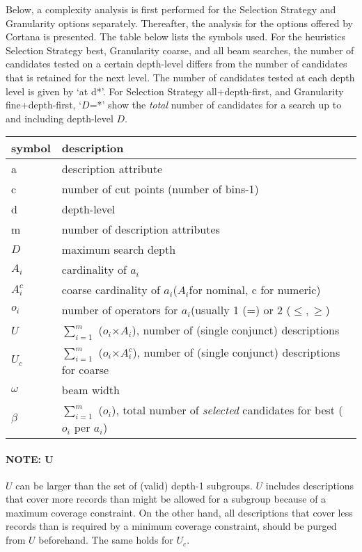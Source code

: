 \documentclass[a4paper]{article}
\newcommand{\ai}{$a_i$}
\newcommand{\Ai}{$A_i$}
\newcommand{\Ci}{$A_i^c$}
\newcommand{\oi}{$o_i$}
\newcommand{\D}{D}
\newcommand{\uu}{$U$}
\newcommand{\uc}{$U_c$}
\newcommand{\bw}{$\omega$}
\newcommand{\bb}[1]{$\beta^{\text{#1}}$}
\newcommand{\X}{$\times$} %
\begin{document}
Below, a complexity analysis is first performed for the Selection Strategy and Granularity options separately.
Thereafter, the analysis for the options offered by Cortana is presented.
The table below lists the symbols used.
For the heuristics Selection Strategy best, Granularity coarse, and all beam searches, the number of candidates tested on a certain depth-level differs from the number of candidates that is retained for the next level.
The number of candidates tested at each depth level is given by `at d*'.
For Selection Strategy all+depth-first, and Granularity fine+depth-first, `$\D$=*' show the \emph{total} number of candidates for a search up to and including depth-level $\D$.

\begin{table}[!h]
\centering
\begin{tabular}{ll}
symbol & description\\
\hline
a      & description attribute\\
c      & number of cut points (number of bins{-}1)\\
d      & depth-level\\
m      & number of description attributes\\
$\D$   & maximum search depth\\
\Ai    & cardinality of \ai\\
\Ci    & coarse cardinality of \ai (\Ai for nominal, c for numeric)\\
\oi    & number of operators for \ai (usually 1 (=) or 2 ($\leq, \geq$)\\
\hline
\uu    & $\sum_{i=1}^m$ (\oi{}\X{}\Ai), number of (single conjunct) descriptions\\
\uc    & $\sum_{i=1}^m$ (\oi{}\X{}\Ci), number of (single conjunct) descriptions for coarse\\
\bw    & beam width\\
\bb{}  & $\sum_{i=1}^m$ (\oi), total number of \emph{selected} candidates for best (\oi{} per \ai)\\
\end{tabular}
\end{table}

\paragraph{NOTE: U}
\uu{} can be larger than the set of (valid) depth-1 subgroups.
\uu{} includes descriptions that cover more records than might be allowed for a subgroup because of a maximum coverage constraint.
On the other hand, all descriptions that cover less records than is required by a minimum coverage constraint, should be purged from \uu{} beforehand.
The same holds for \uc{}.
\end{document}
